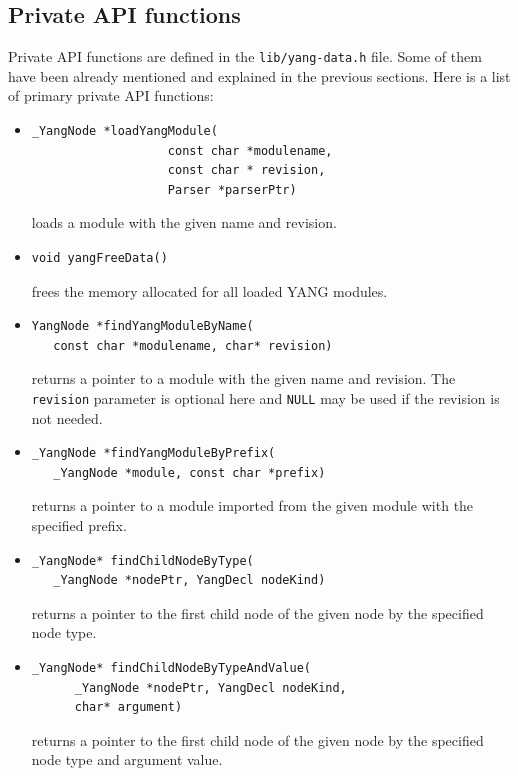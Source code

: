 \documentclass[conference]{IEEEtran}
\begin{document}
\subsection{Private API functions}
Private API functions are defined in the \texttt{lib/yang-data.h} file. 
Some of them have been already mentioned and explained in the previous sections. Here is a list of primary private API functions:
\begin{itemize}
\item
\small
\begin{verbatim}
_YangNode *loadYangModule(
                   const char *modulename, 
                   const char * revision, 
                   Parser *parserPtr)
\end{verbatim}
\normalsize

loads a module with the given name and revision.
\item
\small
\begin{verbatim}
void yangFreeData()
\end{verbatim}
\normalsize
frees the memory allocated for all loaded YANG modules. 

\item
\small
\begin{verbatim}
YangNode *findYangModuleByName(
   const char *modulename, char* revision)
\end{verbatim}
\normalsize
returns a pointer to a module with the given name and revision. 
The \texttt{revision} parameter is optional here and \texttt{NULL} may be used if the revision is not needed.

\item
\small
\begin{verbatim}
_YangNode *findYangModuleByPrefix(
   _YangNode *module, const char *prefix)
\end{verbatim}
\normalsize
returns a pointer to a module imported from the given module with the specified prefix.

\item
\small
\begin{verbatim}
_YangNode* findChildNodeByType(
   _YangNode *nodePtr, YangDecl nodeKind)
\end{verbatim}
\normalsize
returns a pointer to the first child node of the given node by the specified node type.

\item
\small
\begin{verbatim}
_YangNode* findChildNodeByTypeAndValue(
      _YangNode *nodePtr, YangDecl nodeKind, 
      char* argument)
\end{verbatim}
\normalsize
returns a pointer to the first child node of the given node by the specified node type and argument value.


\end{itemize}
\end{document}
